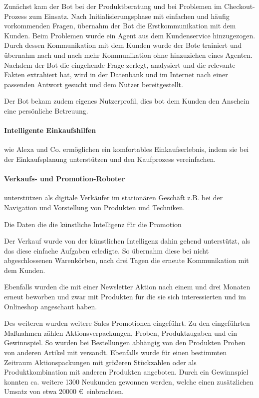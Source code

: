 Zunächst kam der Bot bei der Produktberatung und bei Problemen im Checkout-Prozess zum Einsatz. Nach Initialisierungsphase mit einfachen und häufig vorkommenden Fragen, übernahm der Bot die Erstkommunikation mit dem Kunden. Beim Problemen wurde ein Agent aus dem Kundenservice hinzugezogen. Durch dessen Kommunikation mit dem Kunden wurde der Bote trainiert und übernahm nach und nach mehr Kommunikation ohne hinzuziehen eines Agenten. Nachdem der Bot die eingehende Frage zerlegt, analysiert und die relevante Fakten extrahiert hat, wird in der Datenbank und im Internet nach einer passenden Antwort gesucht und dem Nutzer bereitgestellt.\vspace{0.2cm}

Der Bot bekam zudem eigenes Nutzerprofil, dies bot dem Kunden den Anschein eine persönliche Betreuung.

\paragraph{Intelligente Einkaufshilfen} wie Alexa und Co. ermöglichen ein komfortables Einkaufserlebnis, indem sie bei der Einkaufsplanung unterstützen und den Kaufprozess vereinfachen.

\paragraph{Verkaufs- und Promotion-Roboter} unterstützen als digitale Verkäufer im stationären Geschäft z.B. bei der Navigation und Vorstellung von Produkten und Techniken.\vspace{0.2cm}

Die Daten die die künstliche Intelligenz für die Promotion 

Der Verkauf wurde von der künstlichen Intelligenz dahin gehend unterstützt, als das diese einfache Aufgaben erledigte. So übernahm diese bei nicht abgeschlossenen Warenkörben, nach drei Tagen die erneute Kommunikation mit dem Kunden.\vspace{0.2cm}

Ebenfalls wurden die mit einer Newsletter Aktion nach einem und drei Monaten erneut beworben und zwar mit Produkten für die sie sich interessierten und im Onlineshop angeschaut haben.\vspace{0.2cm}

Des weiteren wurden weitere Sales Promotionen eingeführt. Zu den eingeführten Maßnahmen zählen Aktionsverpackungen, Proben, Produktzugaben und ein Gewinnspiel. So wurden bei Bestellungen abhängig von den Produkten Proben von anderen Artikel mit versandt. Ebenfalls wurde für einen bestimmten Zeitraum Aktionspackungen mit größeren Stückzahlen oder als Produktkombination mit anderen Produkten angeboten. Durch ein Gewinnspiel konnten ca. weitere 1300 Neukunden gewonnen werden, welche einen zusätzlichen Umsatz von etwa 20000 \euro \, einbrachten.
